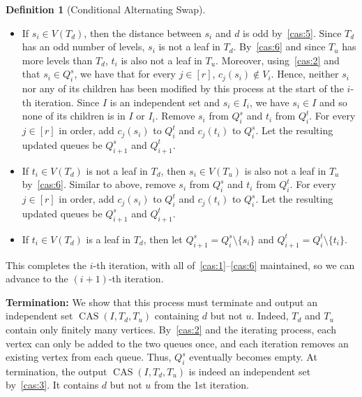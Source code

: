 \documentclass[11pt]{article}
\theoremstyle{definition}
\newtheorem{definition}[theorem]{Definition}
\DeclareMathOperator{\cas}{CAS}
\begin{document}
\begin{definition}[Conditional Alternating Swap]
\begin{enumerate}
    \begin{itemize}
        \item If $s_i\in V(T_d)$, then the distance between $s_i$ and $d$ is odd by~\ref{cas:5}. Since $T_d$ has an odd number of levels, $s_i$ is not a leaf in $T_d$. By~\ref{cas:6} and since $T_u$ has more levels than $T_d$, $t_i$ is also not a leaf in $T_u$. Moreover, using~\ref{cas:2} and that $s_i\in Q_i^s$, we have that for every $j\in[r]$, $c_j(s_i)\not\in V_i$. Hence, neither $s_i$ nor any of its children has been modified by this process at the start of the $i$-th iteration. Since $I$ is an independent set and $s_i\in I_i$, we have $s_i\in I$ and so none of its children is in $I$ or $I_i$. Remove $s_i$ from $Q_i^s$ and $t_i$ from $Q_i^t$. For every $j\in[r]$ in order, add $c_j(s_i)$ to $Q_i^t$ and $c_j(t_i)$ to $Q_i^s$. Let the resulting updated queues be $Q_{i+1}^s$ and $Q_{i+1}^t$. %
        \item If $t_i\in V(T_d)$ is not a leaf in $T_d$, then $s_i\in V(T_u)$ is also not a leaf in $T_u$ by~\ref{cas:6}. Similar to above, remove $s_i$ from $Q_i^s$ and $t_i$ from $Q_i^t$. For every $j\in[r]$ in order, add $c_j(s_i)$ to $Q_i^t$ and $c_j(t_i)$ to $Q_i^s$. Let the resulting updated queues be $Q_{i+1}^s$ and $Q_{i+1}^t$.
        \item If $t_i\in V(T_d)$ is a leaf in $T_d$, then let $Q_{i+1}^s=Q_i^s\setminus\{s_i\}$ and $Q_{i+1}^t=Q_i^t\setminus\{t_i\}$.
    \end{itemize} 
This completes the $i$-th iteration, with all of~\ref{cas:1}--\ref{cas:6} maintained, so we can advance to the $(i+1)$-th iteration. 
\end{enumerate}

\noindent\textbf{Termination:} We show that this process must terminate and output an independent set $\cas(I,T_d,T_u)$ containing $d$ but not $u$. Indeed, $T_d$ and $T_u$ contain only finitely many vertices. By~\ref{cas:2} and the iterating process, each vertex can only be added to the two queues once, and each iteration removes an existing vertex from each queue. Thus, $Q_i^s$ eventually becomes empty. At termination, the output $\cas(I,T_d,T_u)$ is indeed an independent set by~\ref{cas:3}. It contains $d$ but not $u$ from the 1st iteration.
\end{definition}
\end{document}
